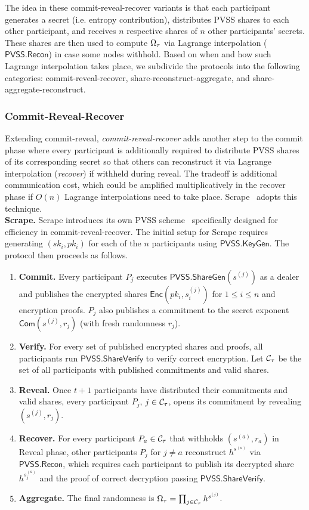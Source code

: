 The idea in these commit-reveal-recover variants is that each participant generates a secret (i.e. entropy contribution), distributes PVSS shares to each other participant, and receives $n$ respective shares of $n$ other participants' secrets. These shares are then used to compute $\Omega_\tau$ via Lagrange interpolation ($\mathsf{PVSS.Recon}$) in case some nodes withhold. Based on when and how such Lagrange interpolation takes place, we subdivide the protocols into the following categories: commit-reveal-recover, share-reconstruct-aggregate, and share-aggregate-reconstruct.

\subsubsection{Commit-Reveal-Recover}
Extending commit-reveal, \textit{commit-reveal-recover} adds another step to the commit phase where every participant is additionally required to distribute PVSS shares of its corresponding secret so that others can reconstruct it via Lagrange interpolation (\textit{recover}) if withheld during reveal. The tradeoff is additional communication cost, which could be amplified multiplicatively in the recover phase if $O(n)$ Lagrange interpolations need to take place. Scrape~\cite{cascudo2017scrape} adopts this technique.\\

\noindent\textbf{Scrape.} Scrape introduces its own PVSS scheme~\cite{cascudo2017scrape} specifically designed for efficiency in commit-reveal-recover. The initial setup for Scrape requires generating $(sk_i, pk_i)$ for each of the $n$ participants using $\mathsf{PVSS.KeyGen}$. The protocol then proceeds as follows.
\begin{enumerate}
\item \textbf{Commit.} Every participant $P_j$ executes $\mathsf{PVSS.ShareGen}(s^{(j)})$ as a dealer and publishes the encrypted shares $\mathsf{Enc}(pk_i, s^{(j)}_i)$ for $1 \le i \le n$ and encryption proofs. $P_j$ also publishes a commitment to the secret exponent $\mathsf{Com}(s^{(j)}, r_j)$ (with fresh randomness $r_j$).
\item \textbf{Verify.} For every set of published encrypted shares and proofs, all participants run $\mathsf{PVSS.ShareVerify}$ to verify correct encryption. Let $\mathcal{C}_\tau$ be the set of all participants with published commitments and valid shares.
\item \textbf{Reveal.} Once $t + 1$ participants have distributed their commitments and valid shares, every participant $P_j$, $j \in \mathcal{C}_\tau$, opens its commitment by revealing $(s^{(j)}, r_j)$.
\item \textbf{Recover.} For every participant $P_a \in \mathcal{C}_\tau$ that withholds $(s^{(a)}, r_a)$ in Reveal phase, other participants $P_j$ for $j \neq a$ reconstruct $h^{s^{(a)}}$ via $\mathsf{PVSS.Recon}$, which requires each participant to publish its decrypted share $h^{s_j^{(a)}}$ and the proof of correct decryption passing $\mathsf{PVSS.ShareVerify}$.
\item \textbf{Aggregate.} The final randomness is $\Omega_\tau = \prod_{j \in \mathcal{C}_\tau} h^{s^{(j)}}$.
\end{enumerate}

